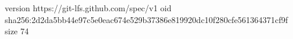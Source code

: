 version https://git-lfs.github.com/spec/v1
oid sha256:2d2da5bb44e97c5e0eac674e529b37386e819920dc10f280cfe561364371cf9f
size 74
